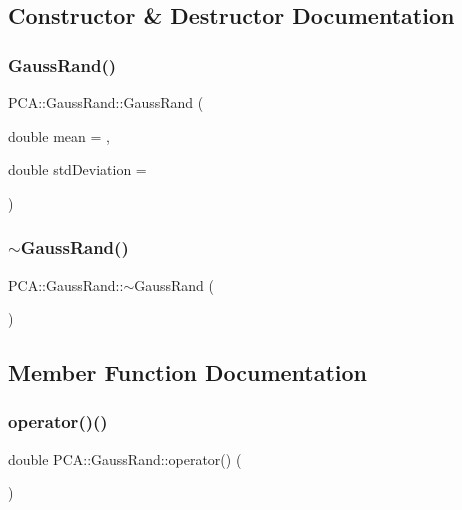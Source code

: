 \subsection{Constructor \& Destructor Documentation}
\hypertarget{class_p_c_a_1_1_gauss_rand_a981fa1a94f0a38702117cc17c3cee549}{}\label{class_p_c_a_1_1_gauss_rand_a981fa1a94f0a38702117cc17c3cee549} 
\subsubsection{\texorpdfstring{Gauss\+Rand()}{GaussRand()}}
{\footnotesize\ttfamily P\+C\+A\+::\+Gauss\+Rand\+::\+Gauss\+Rand (\begin{DoxyParamCaption}\item[{double}]{mean = {},  }\item[{double}]{std\+Deviation = {} }\end{DoxyParamCaption})}

\hypertarget{class_p_c_a_1_1_gauss_rand_aa5419fd06c7192c1d953f90bc38cff94}{}\label{class_p_c_a_1_1_gauss_rand_aa5419fd06c7192c1d953f90bc38cff94} 
\subsubsection{\texorpdfstring{$\sim$\+Gauss\+Rand()}{~GaussRand()}}
{\footnotesize\ttfamily P\+C\+A\+::\+Gauss\+Rand\+::$\sim$\+Gauss\+Rand (\begin{DoxyParamCaption}{ }\end{DoxyParamCaption})}



\subsection{Member Function Documentation}
\hypertarget{class_p_c_a_1_1_gauss_rand_a594130952a4999972f08b429ea6af959}{}\label{class_p_c_a_1_1_gauss_rand_a594130952a4999972f08b429ea6af959} 
\subsubsection{\texorpdfstring{operator()()}{operator()()}}
{\footnotesize\ttfamily double P\+C\+A\+::\+Gauss\+Rand\+::operator() (\begin{DoxyParamCaption}{ }\end{DoxyParamCaption})\hspace{0.3cm}{\ttfamily [virtual]}}



